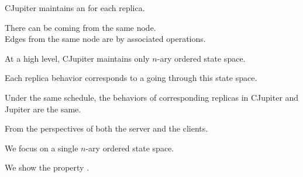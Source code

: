 \begin{frame}{}
  \begin{center}
    {\large CJupiter maintains an  for each replica.}
  \end{center}


  \begin{center} 
    There can be  coming from the same node. \\[5pt]
    Edges from the same node are  by associated operations.
  \end{center}
\end{frame}

\begin{frame}{}
  \begin{center}
    \begin{prop}
      {\large At a high level, CJupiter maintains only  $n$-ary ordered state space.}
    \end{prop}

    \vspace{0.20cm}

    \vspace{0.20cm}
    Each replica behavior corresponds to a  going through this state space.
  \end{center}
\end{frame}

\begin{frame}{}
  \begin{Theorem}
    Under the same schedule, the behaviors of corresponding replicas in CJupiter and Jupiter are the same.
  \end{Theorem}

  \vspace{1.0cm}
  \centerline{\large From the perspectives of both the server and the clients.}
\end{frame}
\begin{frame}{}
  \begin{center}
    {\large We focus on a single $n$-ary ordered state space.}
  \end{center}


  \begin{center}
    {\large We show the  property .}
  \end{center}
\end{frame}

